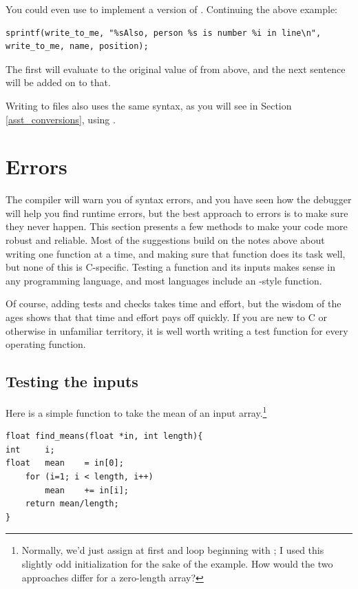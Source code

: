 You could even use  to implement a version of . Continuing the above example:
\begin{lstlisting}
sprintf(write_to_me, "%sAlso, person %s is number %i in line\n", write_to_me, name, position);
\end{lstlisting}
The first  will evaluate to the original value of  from above, and the next
sentence will be added on to that.

Writing to files also uses the same syntax, as you will see in Section \ref{asst_conversions}, using .


\section{\treesymbol Errors} The compiler will warn you of syntax
errors, and you have seen how the debugger will help you find runtime
errors, but the best approach to errors is to make sure they never
happen. This section presents a few methods to make your code more
robust and reliable. Most of the suggestions build on the notes above
about writing one function at a time, and making sure that function does
its task well, but
none of this is C-specific. Testing a function and its inputs makes
sense in any programming language, and most languages include an 
-style function.

Of course, adding tests and checks takes time and effort, but the
wisdom of the ages shows that that time and effort pays off quickly.
If you are new to C or otherwise in unfamiliar territory, it is well
worth writing a test function for every operating function.


\subsection{Testing the inputs} Here is a simple function to take the
mean of an input array.\footnote{Normally, we'd just assign
 at first and loop beginning with ; I used this slightly odd initialization
for the sake of the example. How would the two approaches differ for a
zero-length array?}
\begin{lstlisting}
float find_means(float *in, int length){
int     i;
float   mean    = in[0];
    for (i=1; i < length, i++)
        mean    += in[i];
    return mean/length;
}
\end{lstlisting}

